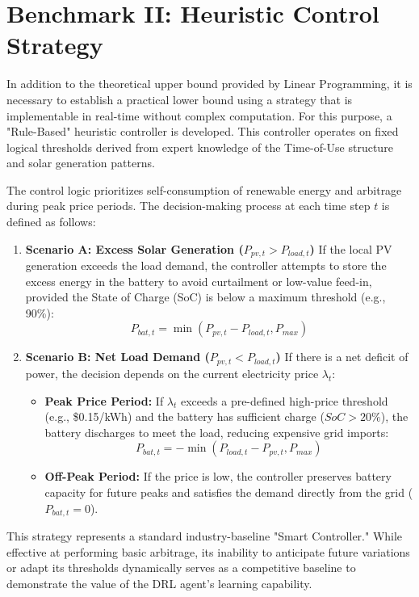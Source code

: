 
\section{Benchmark II: Heuristic Control Strategy}

In addition to the theoretical upper bound provided by Linear Programming, it is necessary to establish a practical lower bound using a strategy that is implementable in real-time without complex computation. For this purpose, a "Rule-Based" heuristic controller is developed. This controller operates on fixed logical thresholds derived from expert knowledge of the Time-of-Use structure and solar generation patterns.

The control logic prioritizes self-consumption of renewable energy and arbitrage during peak price periods. The decision-making process at each time step $t$ is defined as follows:

\begin{enumerate}
    \item \textbf{Scenario A: Excess Solar Generation ($P_{pv, t} > P_{load, t}$)}
    If the local PV generation exceeds the load demand, the controller attempts to store the excess energy in the battery to avoid curtailment or low-value feed-in, provided the State of Charge (SoC) is below a maximum threshold (e.g., 90\%):
    $$ P_{bat, t} = \min(P_{pv, t} - P_{load, t}, P_{max}) $$
    
    \item \textbf{Scenario B: Net Load Demand ($P_{pv, t} < P_{load, t}$)}
    If there is a net deficit of power, the decision depends on the current electricity price $\lambda_t$:
    \begin{itemize}
        \item \textbf{Peak Price Period:} If $\lambda_t$ exceeds a pre-defined high-price threshold (e.g., \$0.15/kWh) and the battery has sufficient charge ($SoC > 20\%$), the battery discharges to meet the load, reducing expensive grid imports:
        $$ P_{bat, t} = -\min(P_{load, t} - P_{pv, t}, P_{max}) $$
        \item \textbf{Off-Peak Period:} If the price is low, the controller preserves battery capacity for future peaks and satisfies the demand directly from the grid ($P_{bat, t} = 0$).
    \end{itemize}
\end{enumerate}

This strategy represents a standard industry-baseline "Smart Controller." While effective at performing basic arbitrage, its inability to anticipate future variations or adapt its thresholds dynamically serves as a competitive baseline to demonstrate the value of the DRL agent's learning capability.
